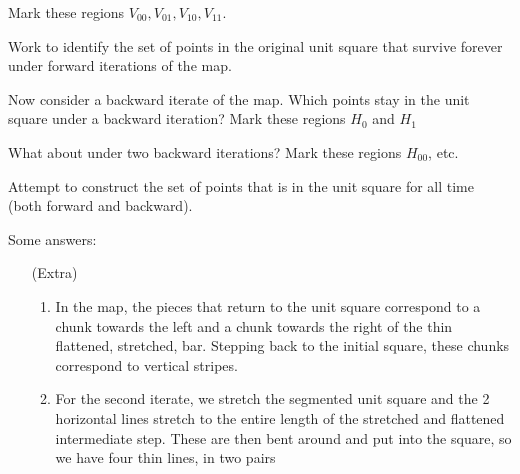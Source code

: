 \documentclass[12pt,letterpaper,noanswers]{exam}
\begin{document}
\begin{questions}
\begin{parts}
Mark these regions $V_{00}, V_{01}, V_{10}, V_{11}$.
\item Work to identify the set of points in the original unit square that survive forever under forward iterations of the map.
\item Now consider a backward iterate of the map.  
Which points stay in the unit square under a backward iteration?  Mark these regions $H_{0}$ and $H_1$
\item What about under two backward iterations?  Mark these regions $H_{00}$, etc.
\item Attempt to construct the set of points that is in the unit square for all time (both forward and backward).
\end{parts}
\end{questions}

\noindent Some answers: 
\begin{enumerate}
\item[(Extra)]
\begin{enumerate}
\item  In the map, the pieces that return to the unit square correspond to a chunk towards the left and a chunk towards the right
of the thin flattened, stretched, bar.  Stepping back to the initial square, these chunks correspond to vertical stripes.
\item For the second iterate, we stretch the segmented unit square and the 2 horizontal lines stretch to the entire length of the stretched
and flattened intermediate step.  These are then bent around and put into the square, so we have four thin lines, in two pairs 
\end{enumerate}
\end{enumerate}
\end{document}
